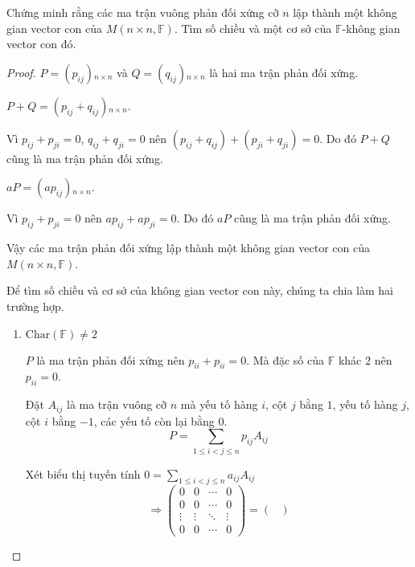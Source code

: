 \documentclass[class=linear-algebra,crop=false]{standalone}
\begin{document}
\begin{exercise}Chứng minh rằng các ma trận vuông phản đối xứng cỡ $n$ lập thành một không gian vector con của $M(n\times n,\mathbb{F})$. Tìm số chiều và một cơ sở của $\mathbb{F}$-không gian vector con đó.
\end{exercise}

\begin{proof}$P = (p_{ij}){}_{n\times n}$ và $Q = (q_{ij}){}_{n\times n}$ là hai ma trận phản đối xứng.
    \par $P + Q = (p_{ij} + q_{ij}){}_{n\times n}$.
    \par Vì $p_{ij} + p_{ji} = 0$, $q_{ij} + q_{ji} = 0$ nên $(p_{ij} + q_{ij}) + (p_{ji} + q_{ji}) = 0$. Do đó $P + Q$ cũng là ma trận phản đối xứng.
    \par $aP = (ap_{ij}){}_{n\times n}$.
    \par Vì $p_{ij} + p_{ji} = 0$ nên $ap_{ij} + ap_{ji} = 0$. Do đó $aP$ cũng là ma trận phản đối xứng.
    \par Vậy các ma trận phản đối xứng lập thành một không gian vector con của $M(n\times n,\mathbb{F})$.
    \par Để tìm số chiều và cơ sở của không gian vector con này, chúng ta chia làm hai trường hợp.
    \begin{enumerate}
        \item $\text{Char}(\mathbb{F})\ne 2$
              \par $P$ là ma trận phản đối xứng nên $p_{ii} + p_{ii} = 0$. Mà đặc số của $\mathbb{F}$ khác $2$ nên $p_{ii} = 0$.
              \par Đặt $A_{ij}$ là ma trận vuông cỡ $n$ mà yếu tố hàng $i$, cột $j$ bằng $1$, yếu tố hàng $j$, cột $i$ bằng $-1$, các yếu tố còn lại bằng $0$.
              \[ P = \sum_{1\le i < j \le n}p_{ij}A_{ij} \]
              \par Xét biểu thị tuyến tính $0 = \displaystyle\sum_{1\le i < j\le n}a_{ij}A_{ij}$
              \[
                  \Rightarrow
                  \begin{pmatrix}
                      0      & 0      & \cdots & 0      \\
                      0      & 0      & \cdots & 0      \\
                      \vdots & \vdots & \ddots & \vdots \\
                      0      & 0      & \cdots & 0
                  \end{pmatrix} =
                  \begin{pmatrix}

\end{pmatrix}\]
\end{enumerate}
\end{proof}
\end{document}
